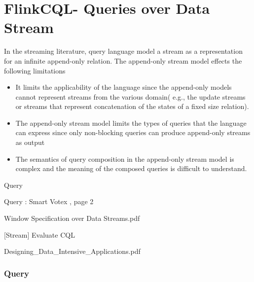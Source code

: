 
\chapter{FlinkCQL- Queries over Data Stream}

\ifpdf
    \graphicspath{{Chapter4/Figs/Raster/}{Chapter4/Figs/PDF/}{Chapter4/Figs/}}
\else
    \graphicspath{{Chapter4/Figs/Vector/}{Chapter4/Figs/}}
\fi

In the streaming literature, query language model a stream as a representation for an infinite append-only relation. The append-only stream model effects the following limitations\citep{Ghanem:2008}
\begin{itemize}
\item It limits the applicability of the language since the append-only models cannot represent streams from the various domain( e.g., the update streams or streams that represent concatenation of the states of a fixed size relation).
\item The append-only stream model limits the types of queries that the language can express since only non-blocking queries can produce append-only streams as output
\item The semantics of query composition in the append-only stream model is complex and the meaning of the composed queries is difficult to understand.
\end{itemize}

Query \citep{Babcock:2002} 

Query : Smart Votex , page 2

Window Specification over Data Streams.pdf

[Stream] Evaluate CQL

Designing\_Data\_Intensive\_Applications.pdf



\subsection*{Query}

